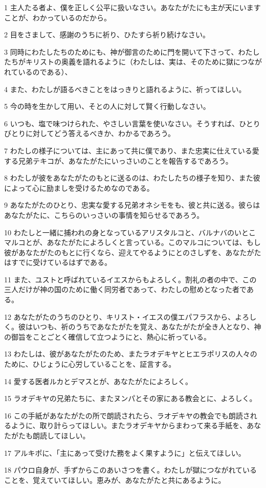 \par 1 主人たる者よ、僕を正しく公平に扱いなさい。あなたがたにも主が天にいますことが、わかっているのだから。
\par 2 目をさまして、感謝のうちに祈り、ひたすら祈り続けなさい。
\par 3 同時にわたしたちのためにも、神が御言のために門を開いて下さって、わたしたちがキリストの奥義を語れるように（わたしは、実は、そのために獄につながれているのである）、
\par 4 また、わたしが語るべきことをはっきりと語れるように、祈ってほしい。
\par 5 今の時を生かして用い、そとの人に対して賢く行動しなさい。
\par 6 いつも、塩で味つけられた、やさしい言葉を使いなさい。そうすれば、ひとりびとりに対してどう答えるべきか、わかるであろう。
\par 7 わたしの様子については、主にあって共に僕であり、また忠実に仕えている愛する兄弟テキコが、あなたがたにいっさいのことを報告するであろう。
\par 8 わたしが彼をあなたがたのもとに送るのは、わたしたちの様子を知り、また彼によって心に励ましを受けるためなのである。
\par 9 あなたがたのひとり、忠実な愛する兄弟オネシモをも、彼と共に送る。彼らはあなたがたに、こちらのいっさいの事情を知らせるであろう。
\par 10 わたしと一緒に捕われの身となっているアリスタルコと、バルナバのいとこマルコとが、あなたがたによろしくと言っている。このマルコについては、もし彼があなたがたのもとに行くなら、迎えてやるようにとのさしずを、あなたがたはすでに受けているはずである。
\par 11 また、ユストと呼ばれているイエスからもよろしく。割礼の者の中で、この三人だけが神の国のために働く同労者であって、わたしの慰めとなった者である。
\par 12 あなたがたのうちのひとり、キリスト・イエスの僕エパフラスから、よろしく。彼はいつも、祈のうちであなたがたを覚え、あなたがたが全き人となり、神の御旨をことごとく確信して立つようにと、熱心に祈っている。
\par 13 わたしは、彼があなたがたのため、またラオデキヤとヒエラポリスの人々のために、ひじょうに心労していることを、証言する。
\par 14 愛する医者ルカとデマスとが、あなたがたによろしく。
\par 15 ラオデキヤの兄弟たちに、またヌンパとその家にある教会とに、よろしく。
\par 16 この手紙があなたがたの所で朗読されたら、ラオデキヤの教会でも朗読されるように、取り計らってほしい。またラオデキヤからまわって来る手紙を、あなたがたも朗読してほしい。
\par 17 アルキポに、「主にあって受けた務をよく果すように」と伝えてほしい。
\par 18 パウロ自身が、手ずからこのあいさつを書く。わたしが獄につながれていることを、覚えていてほしい。恵みが、あなたがたと共にあるように。


